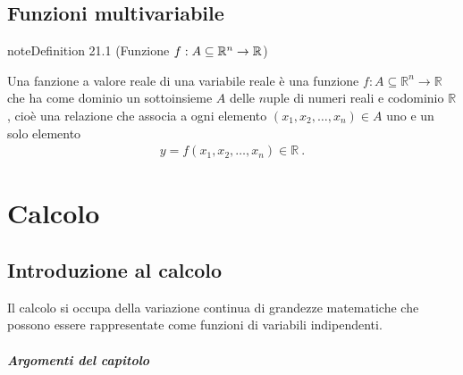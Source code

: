 \documentclass[letterpaper,10pt,italian]{jupyterBook}
\begin{document}
\chapter{Funzioni multi\sphinxhyphen{}variabile}
\label{\detokenize{ch/precalculus/multivariable-real-fun:funzioni-multi-variabile}}\label{\detokenize{ch/precalculus/multivariable-real-fun:math-hs-precalculus-multivariable-real-fun}}\label{\detokenize{ch/precalculus/multivariable-real-fun::doc}}\label{ch/precalculus/multivariable-real-fun:definition-0}
\begin{sphinxadmonition}{note}{Definition 21.1 (Funzione \protect\(f: A \subseteq \mathbb{R}^n \rightarrow \mathbb{R}\protect\))}



\sphinxAtStartPar
Una fanzione a valore reale di una variabile reale è una funzione \(f: A \subseteq \mathbb{R}^n \rightarrow \mathbb{R}\) che ha come dominio un sottoinsieme \(A\) delle \(n\)\sphinxhyphen{}uple di numeri reali e codominio \(\mathbb{R}\), cioè una relazione che associa a ogni elemento \((x_1, x_2, \dots, x_n) \in A\) uno e un solo elemento
\begin{equation*}
\begin{split}y = f(x_1, x_2, \dots, x_n) \in \mathbb{R} \ .\end{split}
\end{equation*}\end{sphinxadmonition}

\sphinxstepscope


\part{Calcolo}

\sphinxstepscope




\chapter{Introduzione al calcolo}
\label{\detokenize{ch/calculus:introduzione-al-calcolo}}\label{\detokenize{ch/calculus:math-hs-calculus}}\label{\detokenize{ch/calculus::doc}}
\sphinxAtStartPar
Il calcolo si occupa della variazione continua di grandezze matematiche che possono essere rappresentate come funzioni di variabili indipendenti.
\subsubsection*{Argomenti del capitolo}
\end{document}
